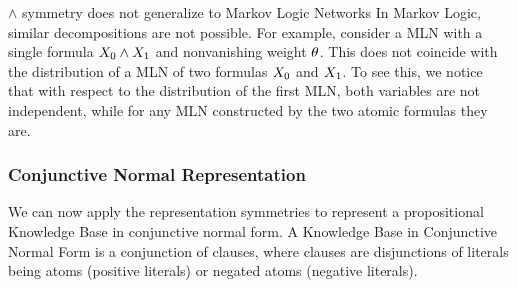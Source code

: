 \begin{remark}{$\land$ symmetry does not generalize to Markov Logic Networks}
	In Markov Logic, similar decompositions are not possible.
	For example, consider a MLN with a single formula $X_{0}\land X_{1}$ and nonvanishing weight $\theta$.
	This does not coincide with the distribution of a MLN of two formulas $X_{0}$ and $X_{1}$.
	To see this, we notice that with respect to the distribution of the first MLN, both variables are not independent, while for any MLN constructed by the two atomic formulas they are.
\end{remark}


%
%
%
%


\subsubsection{Conjunctive Normal Representation}


We can now apply the representation symmetries to represent a propositional Knowledge Base in conjunctive normal form.
A Knowledge Base in Conjunctive Normal Form is a conjunction of clauses, where clauses are disjunctions of literals being atoms (positive literals) or negated atoms (negative literals).




